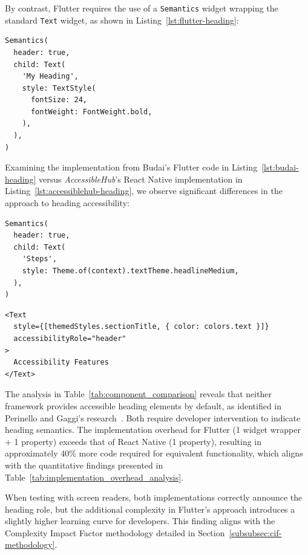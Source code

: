 By contrast, Flutter requires the use of a \texttt{Semantics} widget wrapping the standard \texttt{Text} widget, as shown in Listing~\ref{lst:flutter-heading}:

\begin{lstlisting}[style=DartStyle, caption=Heading implementation in Flutter, label=lst:flutter-heading]
Semantics(
  header: true,
  child: Text(
    'My Heading',
    style: TextStyle(
      fontSize: 24,
      fontWeight: FontWeight.bold,
    ),
  ),
)
\end{lstlisting}

Examining the implementation from Budai's Flutter code in Listing~\ref{lst:budai-heading} versus \textit{AccessibleHub}'s React Native implementation in Listing~\ref{lst:accessiblehub-heading}, we observe significant differences in the approach to heading accessibility:

\begin{lstlisting}[style=DartStyle, caption=Budai's Flutter implementation of headers, label=lst:budai-heading]
Semantics(
  header: true,
  child: Text(
    'Steps',
    style: Theme.of(context).textTheme.headlineMedium,
  ),
)
\end{lstlisting}

\begin{lstlisting}[style=ReactNativeStyle, caption=AccessibleHub's React Native implementation of headers, label=lst:accessiblehub-heading]
<Text 
  style={[themedStyles.sectionTitle, { color: colors.text }]} 
  accessibilityRole="header"
>
  Accessibility Features
</Text>
\end{lstlisting}

\pagebreak

The analysis in Table~\ref{tab:component_comparison} reveals that neither framework provides accessible heading elements by default, as identified in Perinello and Gaggi's research~\cite{perinello2024accessibility}. Both require developer intervention to indicate heading semantics. The implementation overhead for Flutter (1 widget wrapper + 1 property) exceeds that of React Native (1 property), resulting in approximately 40\% more code required for equivalent functionality, which aligns with the quantitative findings presented in Table~\ref{tab:implementation_overhead_analysis}.

When testing with screen readers, both implementations correctly announce the heading role, but the additional complexity in Flutter's approach introduces a slightly higher learning curve for developers. This finding aligns with the Complexity Impact Factor methodology detailed in Section~\ref{subsubsec:cif-methodology}.

